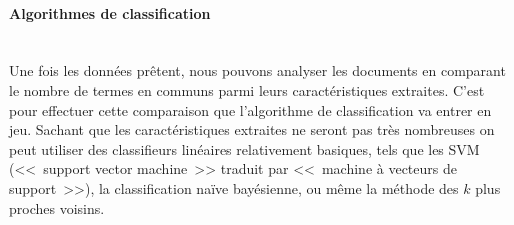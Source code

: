 \paragraph*{Algorithmes de classification}
~\\

Une fois les données prêtent, nous pouvons analyser les documents en comparant le nombre de termes en communs parmi leurs caractéristiques extraites.
C'est pour effectuer cette comparaison que l'algorithme de classification va entrer en jeu.
Sachant que les caractéristiques extraites ne seront pas très nombreuses on peut utiliser des classifieurs linéaires relativement basiques, tels que les SVM (<<~support vector machine~>> traduit par <<~machine à vecteurs de support~>>),  la classification naïve bayésienne, ou même la méthode des $k$ plus proches voisins.

